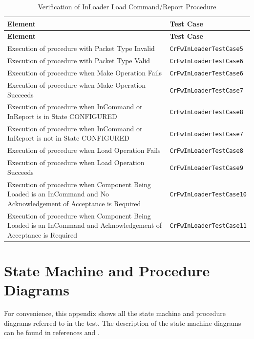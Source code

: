 \documentclass[a4paper,10pt]{article}
\let\stdsection\section
\renewcommand\section{\newpage\stdsection}
\begin{document}
\begin{longtable}{|>{\raggedright}p{6.0cm}|P{5.0cm}|}
\caption{Verification of InLoader Load Command/Report Procedure}
\label{tab:verInLoaderLoadCmdRepProc}\\
\hline
{}
\textbf{Element} & \textbf{Test Case} \\
\hline
\endfirsthead
{}
\textbf{Element} & \textbf{Test Case} \\
\hline
\endhead
Execution of procedure with Packet Type Invalid & \texttt{CrFwInLoaderTestCase5}\\
\hline
Execution of procedure with Packet Type Valid & \texttt{CrFwInLoaderTestCase6}\\
\hline
Execution of procedure when Make Operation Fails & \texttt{CrFwInLoaderTestCase6}\\
\hline
Execution of procedure when Make Operation Succeeds & \texttt{CrFwInLoaderTestCase7}\\
\hline
Execution of procedure when InCommand or InReport is in State CONFIGURED & \texttt{CrFwInLoaderTestCase8}\\
\hline
Execution of procedure when InCommand or InReport is not in State CONFIGURED & \texttt{CrFwInLoaderTestCase7}\\
\hline
Execution of procedure when Load Operation Fails & \texttt{CrFwInLoaderTestCase8}\\
\hline
Execution of procedure when Load Operation Succeeds & \texttt{CrFwInLoaderTestCase9}\\
\hline
Execution of procedure when Component Being Loaded is an InCommand and No Acknowledgement of Acceptance is Required & \texttt{CrFwInLoaderTestCase10}\\
\hline
Execution of procedure when Component Being Loaded is an InCommand and Acknowledgement of Acceptance is Required & \texttt{CrFwInLoaderTestCase11}\\
\hline
\end{longtable}

\section{State Machine and Procedure Diagrams}\label{sec:smAndProcDiagrams}
For convenience, this appendix shows all the state machine and procedure diagrams referred to  in the test. The description of the state machine diagrams can be found in references \cite{ref:cordetfw} and \cite{ref:C2Implementation}.
\end{document}
